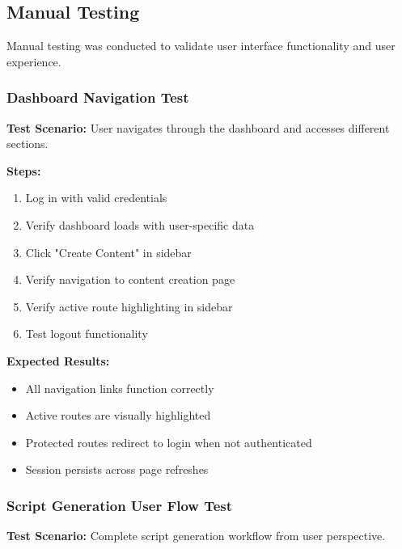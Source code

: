 \subsection{Manual Testing}

Manual testing was conducted to validate user interface functionality and user experience.

\subsubsection{Dashboard Navigation Test}

\textbf{Test Scenario:} User navigates through the dashboard and accesses different sections.

\textbf{Steps:}
\begin{enumerate}
    \item Log in with valid credentials
    \item Verify dashboard loads with user-specific data
    \item Click "Create Content" in sidebar
    \item Verify navigation to content creation page
    \item Verify active route highlighting in sidebar
    \item Test logout functionality
\end{enumerate}

\textbf{Expected Results:}
\begin{itemize}
    \item All navigation links function correctly
    \item Active routes are visually highlighted
    \item Protected routes redirect to login when not authenticated
    \item Session persists across page refreshes
\end{itemize}

\subsubsection{Script Generation User Flow Test}

\textbf{Test Scenario:} Complete script generation workflow from user perspective.

